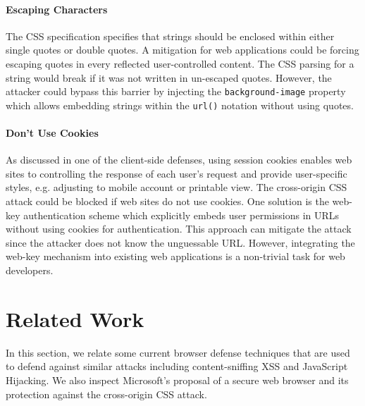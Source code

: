 \documentclass{acm_proc_article-sp}
\begin{document}
{\paragraph{Escaping Characters}
The CSS specification specifies that strings should be enclosed within either single quotes or double quotes. A mitigation for web applications could be forcing escaping quotes in every reflected user-controlled content. The CSS parsing for a string would break if it was not written in un-escaped quotes. However, the attacker could bypass this barrier by injecting the \texttt{background-image} property which allows embedding strings within the \texttt{url()} notation without using quotes.

\paragraph{Don't Use Cookies}
As discussed in one of the client-side defenses, using session cookies enables web sites to controlling the response of each user's request and provide user-specific styles, e.g. adjusting to mobile account or printable view. The cross-origin CSS attack could be blocked if web sites do not use cookies. One solution is the web-key authentication scheme \cite{webkey} which explicitly embeds user permissions in URLs without using cookies for authentication. This approach can mitigate the attack since the attacker does not know the unguessable URL. However, integrating the web-key mechanism into existing web applications is a non-trivial task for web developers.

\section{Related Work}
In this section, we relate some current browser defense techniques that are used to defend against similar attacks including content-sniffing XSS and JavaScript Hijacking. We also inspect Microsoft's proposal of a secure web browser and its protection against the cross-origin CSS attack.

}
\end{document}
